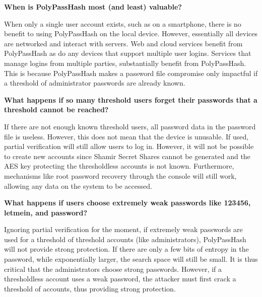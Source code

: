 {\bf When is PolyPassHash most (and least) valuable?}

When only a single user account exists, such as on a smartphone, 
there is no benefit to using PolyPassHash on the local device.   However, 
essentially all devices are networked and interact with servers.   Web and 
cloud services benefit from PolyPassHash as do any devices that support
multiple user logins.   
Services that manage logins from multiple parties, substantially benefit from
PolyPassHash.     This is because PolyPassHash makes 
a password file compromise only impactful if a threshold of administrator
passwords are already known.   %


{\bf What happens if so many threshold users forget their passwords that a
threshold cannot be reached?}

If there are not enough known threshold users, all password data in the
password file is useless.   However, this does not mean that the device is
unusable.   If used, partial verification will still allow users to log in.   
However, it will not be possible to create new accounts since Shamir
Secret Shares cannot be generated and the AES key protecting the thresholdless
accounts is not known.  Furthermore, mechanisms like root password recovery 
through
the console will still work, allowing any data on the system to be accessed.




%



{\bf What happens if users choose extremely weak passwords like 123456, 
letmein, and password?}

Ignoring partial verification for the moment, 
if extremely weak passwords are used for a threshold of threshold accounts 
(like administrators), PolyPassHash will not provide strong protection.   If
there are only a few bits of entropy in the password, while exponentially
larger, the search space will still be small.   It is thus critical that
the administrators choose strong passwords.   However,
if a thresholdless account uses a weak password, the attacker must first
crack a threshold of accounts, thus providing strong protection.

